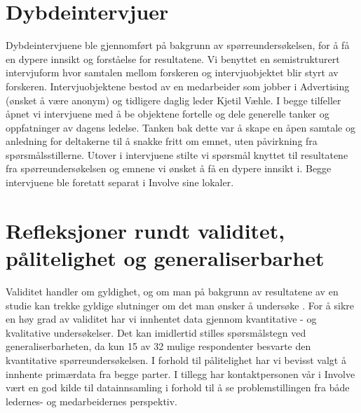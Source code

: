 \section{Dybdeintervjuer}
Dybdeintervjuene ble gjennomført på bakgrunn av spørreundersøkelsen, for å få en dypere innsikt og forståelse for resultatene. Vi benyttet en semistrukturert intervjuform hvor samtalen mellom forskeren og intervjuobjektet blir styrt av forskeren. Intervjuobjektene bestod av en medarbeider som jobber i Advertising (ønsket å være anonym) og tidligere daglig leder Kjetil Væhle. I begge tilfeller åpnet vi intervjuene med å be objektene fortelle og dele generelle tanker og oppfatninger av dagens ledelse. Tanken bak dette var å skape en åpen samtale og anledning for deltakerne til å snakke fritt om emnet, uten påvirkning fra spørsmålsstillerne. Utover i intervjuene stilte vi spørsmål knyttet til resultatene fra spørreundersøkelsen og emnene vi ønsket å få en dypere innsikt i. Begge intervjuene ble foretatt separat i Involve sine lokaler.

\section{Refleksjoner rundt validitet, pålitelighet og generaliserbarhet}
Validitet handler om gyldighet, og om man på bakgrunn av resultatene av en studie kan trekke gyldige slutninger om det man ønsker å undersøke \cite{validitet}. For å sikre en høy grad av validitet har vi innhentet data gjennom kvantitative - og kvalitative undersøkelser. Det kan imidlertid stilles spørsmålstegn ved generaliserbarheten, da kun 15 av 32 mulige respondenter besvarte den kvantitative spørreundersøkelsen. I forhold til pålitelighet har vi bevisst valgt å innhente primærdata fra begge parter. I tillegg har kontaktpersonen vår i Involve vært en god kilde til datainnsamling i forhold til å se problemstillingen fra både ledernes- og medarbeidernes perspektiv. 